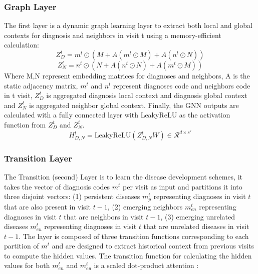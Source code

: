 \documentclass[11pt,a4paper,fleqn]{article}
\begin{document}
\subsubsection{Graph Layer}
The first layer is a dynamic graph learning layer to extract both local and
global contexts for diagnosis and neighbors in visit t using a memory-efficient
calculation:
\begin{equation}
  Z_D^t =m^t \odot (M + A(m^t\odot M) + A(n^t\odot N))
\end{equation}
\begin{equation}
  Z_N^t =n^t \odot (N + A(n^t\odot N) + A(m^t\odot M))
\end{equation}
Where M,N represent embedding matrices for diagnoses and neighbors, A is the
static adjacency matrix, $m^t$ and $n^t$ represent diagnoses code and neighbors
code in t visit, $Z_D^t$ is aggregated diagnosis local context and diagnosis
global context and $Z_N^t$ is aggregated neighbor global context. Finally, the
GNN outputs are calculated with a fully connected layer with LeakyReLU as the
activation function from $Z_D^t$ and $Z_N^t$.
\begin{equation}
  H^t_{D,N}=\textrm{LeakyReLU}(Z^t_{D,N}W)\in\mathcal{R}^{d\times s'}
\end{equation}

\subsubsection{Transition Layer}
The Transition (second) Layer is to learn the disease development schemes, it
takes the vector of diagnosis codes $m^t$ per visit as input and partitions it
into three disjoint vectors: (1) persistent diseases $m_p^t$ representing
diagnoses in visit $t$ that are also present in visit $t-1$, (2) emerging
neighbors $m_{en}^t$ representing diagnoses in visit $t$ that are neighbors in
visit $t-1$, (3) emerging unrelated diseases $m_{eu}^t$ representing diagnoses
in visit $t$ that are unrelated diseases in visit $t-1$. The layer is composed
of three transition functions corresponding to each partition of $m^t$ and are
designed to extract historical context from previous visits to compute the
hidden values. The transition function for calculating the hidden values for
both $m_{en}^t$ and $m_{eu}^t$ is a scaled dot-product attention
\cite{dp_attention}: 
\end{document}
